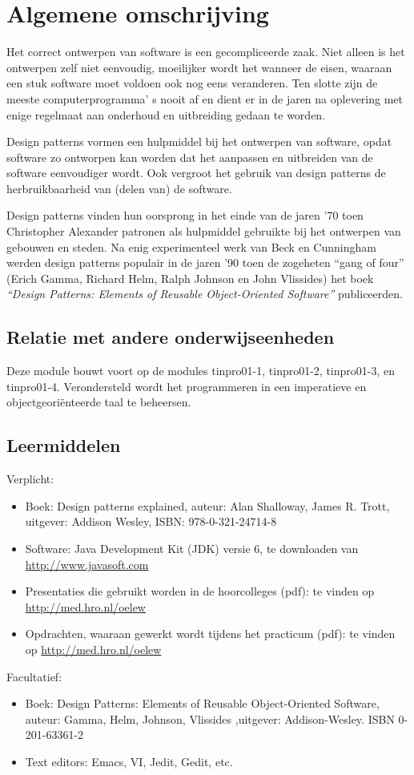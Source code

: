 \documentclass[titlepage,a4paper, 11pt]{article}
\begin{document}
\section{Algemene omschrijving}
Het correct ontwerpen van software is een gecompliceerde zaak. Niet alleen is het ontwerpen zelf niet eenvoudig, moeilijker wordt het wanneer de eisen, waaraan een stuk software moet voldoen ook nog eens veranderen. Ten slotte zijn de meeste computerprogramma' s nooit af en dient er in de jaren na oplevering met enige regelmaat aan onderhoud en uitbreiding gedaan te worden. 

Design patterns vormen een hulpmiddel bij het ontwerpen van software, opdat software zo ontworpen kan worden dat het aanpassen en uitbreiden van de software eenvoudiger wordt. Ook vergroot het gebruik van design patterns de herbruikbaarheid van (delen van) de software.

Design patterns vinden hun oorsprong in het einde van de jaren '70 toen Christopher Alexander patronen als hulpmiddel gebruikte bij het ontwerpen van gebouwen en steden. Na enig experimenteel werk van Beck en Cunningham werden design patterns populair in de jaren '90 toen de zogeheten ``gang of four'' (Erich Gamma, Richard Helm, Ralph Johnson en John Vlissides) het boek \emph{``Design Patterns: Elements of Reusable Object-Oriented Software''} publiceerden.
\subsection{Relatie met andere onderwijseenheden}
Deze module bouwt voort op de modules tinpro01-1, tinpro01-2, tinpro01-3, en tinpro01-4. Verondersteld wordt het programmeren in een imperatieve en objectgeori\"enteerde taal te beheersen. 
\subsection{Leermiddelen}
Verplicht:
\begin{itemize}
\item Boek: Design patterns explained, auteur: Alan Shalloway, James R. Trott, uitgever: Addison Wesley, ISBN: 978-0-321-24714-8
\item Software: Java Development Kit (JDK) versie 6, te downloaden van \url{http://www.javasoft.com}
\item Presentaties die gebruikt worden in de hoorcolleges (pdf): te vinden op \url{http://med.hro.nl/oelew}
\item Opdrachten, waaraan gewerkt wordt tijdens het practicum (pdf): te vinden op \url{http://med.hro.nl/oelew}
\end{itemize}
Facultatief:
\begin{itemize}
\item Boek: Design Patterns: Elements of Reusable Object-Oriented Software, auteur: Gamma, Helm, Johnson, Vlissides ,uitgever: Addison-Wesley. ISBN 0-201-63361-2
\item Text editors: Emacs, VI, Jedit, Gedit, etc.
\end{itemize}
\end{document}

